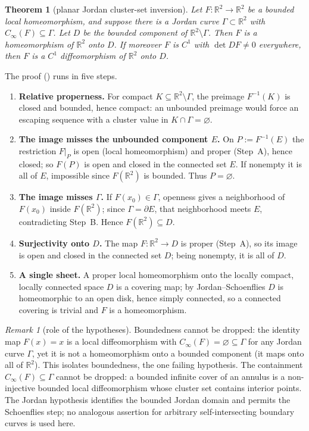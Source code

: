 \documentclass[11pt,twoside,leqno]{article}
\theoremstyle{plain}
\newtheorem{theorem}{Theorem}[section]
\theoremstyle{definition}
\theoremstyle{remark}
\newtheorem{remark}[remark]{Remark}
\newcommand{\R}{\mathbb{R}}
\newcommand{\clinf}{C_{\infty}}
\begin{document}
\begin{theorem}[planar Jordan cluster-set inversion]\label{thm:main}
Let $F:\R^2\to\R^2$ be a bounded local homeomorphism, and suppose there is a Jordan curve $\Gamma\subset\R^2$ with $\clinf(F)\subseteq\Gamma$. Let $D$ be the bounded component of $\R^2\setminus\Gamma$. Then $F$ is a homeomorphism of $\R^2$ onto $D$. If moreover $F$ is $C^1$ with $\det DF\neq 0$ everywhere, then $F$ is a $C^1$ diffeomorphism of $\R^2$ onto $D$.
\end{theorem}

The proof () runs in five steps.
\begin{enumerate}[label=\textbf{Step \Alph*.},leftmargin=*]
\item \textbf{Relative properness.} For compact $K\subseteq\R^2\setminus\Gamma$, the preimage $F^{-1}(K)$ is closed and bounded, hence compact: an unbounded preimage would force an escaping sequence with a cluster value in $K\cap\Gamma=\varnothing$.
\item \textbf{The image misses the unbounded component $E$.} On $P:=F^{-1}(E)$ the restriction $F|_P$ is open (local homeomorphism) and proper (Step~A), hence closed; so $F(P)$ is open and closed in the connected set $E$. If nonempty it is all of $E$, impossible since $F(\R^2)$ is bounded. Thus $P=\varnothing$.
\item \textbf{The image misses $\Gamma$.} If $F(x_0)\in\Gamma$, openness gives a neighborhood of $F(x_0)$ inside $F(\R^2)$; since $\Gamma=\partial E$, that neighborhood meets $E$, contradicting Step~B. Hence $F(\R^2)\subseteq D$.
\item \textbf{Surjectivity onto $D$.} The map $F:\R^2\to D$ is proper (Step~A), so its image is open and closed in the connected set $D$; being nonempty, it is all of $D$.
\item \textbf{A single sheet.} A proper local homeomorphism onto the locally compact, locally connected space $D$ is a covering map; by Jordan--Schoenflies $D$ is homeomorphic to an open disk, hence simply connected, so a connected covering is trivial and $F$ is a homeomorphism.
\end{enumerate}

\begin{remark}[role of the hypotheses]\label{rmk:sharp}
Boundedness cannot be dropped: the identity map $F(x)=x$ is a local diffeomorphism with $\clinf(F)=\varnothing\subseteq\Gamma$ for any Jordan curve $\Gamma$, yet it is not a homeomorphism onto a bounded component (it maps onto all of $\R^2$). This isolates boundedness, the one failing hypothesis. The containment $\clinf(F)\subseteq\Gamma$ cannot be dropped: a bounded infinite cover of an annulus is a non-injective bounded local diffeomorphism whose cluster set contains interior points. The Jordan hypothesis identifies the bounded Jordan domain and permits the Schoenflies step; no analogous assertion for arbitrary self-intersecting boundary curves is used here.
\end{remark}
\end{document}
